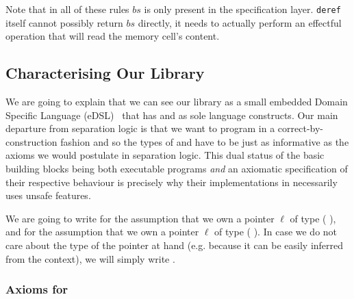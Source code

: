 Note that in all of these rules $\mathit{bs}$ is only present
in the specification layer. \texttt{deref} itself cannot possibly
return $\mathit{bs}$ directly, it needs to actually perform an
effectful operation that will read the memory cell's content.

\subsection{Characterising Our Library}

We are going to explain that we can see our library as a small
embedded Domain Specific
Language (eDSL)~\cite{DBLP:journals/csur/Hudak96}
that has  and  as
sole language constructs.
%
Our main departure from separation logic is that we want to
program in a correct-by-construction fashion and so the types
of  and  have to be
just as informative as the axioms we would postulate
in separation logic.
%
This dual status of the basic building blocks being both
executable programs \emph{and} an axiomatic specification
of their respective behaviour is precisely why their
implementations in \idris{} necessarily uses unsafe features.

We are going to write  for the assumption
that we own a pointer $\ell$ of type
(   ),
and  for the assumption that we own
a pointer $\ell$ of type (  ).
%
In case we do not care about the type of the pointer at hand
(e.g. because it can be easily inferred from the context), we
will simply write .


\subsubsection{Axioms for }

